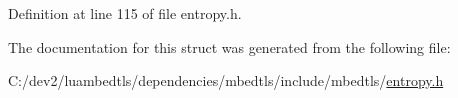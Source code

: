 Definition at line 115 of file entropy.\-h.



The documentation for this struct was generated from the following file\-:\begin{DoxyCompactItemize}
\item 
C\-:/dev2/luambedtls/dependencies/mbedtls/include/mbedtls/\hyperlink{entropy_8h}{entropy.\-h}\end{DoxyCompactItemize}
